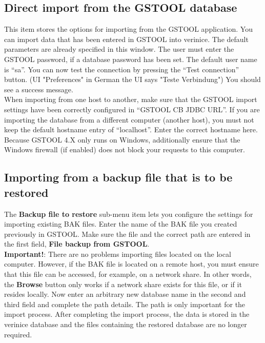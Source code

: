 \documentclass[a4paper,10pt]{book}
\begin{document}
\subsection{Direct import from the GSTOOL database}
This item stores the options for importing from the \textsc{GSTOOL} application. You can import data that has been entered in \textsc{GSTOOL}
into verinice. The default parameters are already specified in this window. The user must enter the \textsc{GSTOOL}
password, if a database password has been set. The default user name is ``sa''.
You can now test the connection by pressing the ``Test connection'' button. (UI "Preferences" in German the UI says "Teste Verbindung") You should see a success message.
\newline\\
When importing from one host to another, make sure that the \textsc{GSTOOL} import settings have been correctly configured in
``\textsc{GSTOOL CB JDBC URL}''. If you are importing the database from a different computer (another host), you must not keep the default
hostname entry of ``localhost''. Enter the correct hostname here. Because \textsc{GSTOOL} 4.X only runs on Windows,
additionally ensure that the Windows firewall (if enabled) does not block your requests to this computer.

\subsection{Importing from a backup file that is to be restored}
The \textbf{Backup file to restore} sub-menu item lets you configure the settings for importing existing BAK files.
Enter the name of the BAK file you created previously in \textsc{GSTOOL}. Make sure the file and the correct
path are entered in the first field, \textbf{File backup from \textsc{GSTOOL}}.
\newline\\
\textbf{Important!}: There are no problems importing files located on the local computer. However, if the BAK file is located on a remote host,
you must ensure that this file can be accessed, for example, on a network share. In other words, the
\textbf{Browse} button only works if a network share exists for this file, or if it resides locally.
Now enter an arbitrary new database name in the second and third field and complete the path details.
The path is only important for the import process. After completing the import process, the data is stored in
the verinice database and the files containing the restored database are no longer required.
\end{document}
